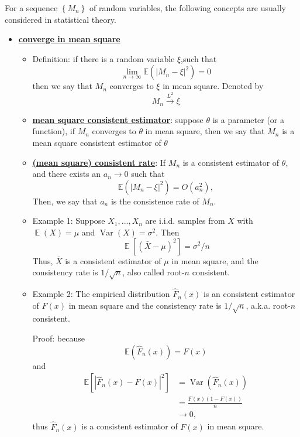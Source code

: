 \documentclass[19pt,landscaoe]{article}
\DeclareMathOperator{\E}{\mathbb{E}}
\DeclareMathOperator{\Var}{\mathrm{Var}}
\begin{document}


For a sequence $\left\{M_n\right\}$ of random variables, the following concepts are usually considered in statistical theory.

\begin{itemize}


\item \underline{\bf converge in mean square}

\begin{itemize}

\item Definition: if there is a random variable $ \xi $,such that
$$
\lim_{n\to \infty } \mathbb{E} (|M_n - \xi|^2)=0
$$
then we say that $ M_n $ converges to $ \xi $ in mean square. Denoted by
$$
M_n \stackrel{L^2}{\rightarrow} \xi
$$

\item \underline{\bf mean square consistent estimator}:  suppose $ \theta $ is a parameter (or a function), if $ M_n $ converges to $ \theta $ in mean square, then we say that $ M_n $ is a mean square consistent  estimator of $  \theta $


\item  \underline{\bf (mean square) consistent rate}: If $M_n$ is a consistent estimator of $ \theta $,  and there exists an $ a_n \to 0 $ such that 
$$
  \mathbb{E} (|M_n - \xi|^2) = O(a_n^2),
$$
Then, we say that $a_n $ is the consistence rate of $ M_n$.

\item Example 1: Suppose $ X_1, ..., X_n $ are i.i.d. samples from $ X $ with $ \E(X) = \mu $ and $ \Var(X) = \sigma^2 $. Then 
    $$
      \E [(\bar X - \mu)^2]  = \sigma^2/n  
    $$
    Thus, $ \bar X$ is a consistent estimator of $ \mu $ in mean square, and the consistency rate is $ 1/\sqrt{n} $, also called root-$n$ consistent.
\item Example 2: The empirical distribution $\hat{F}_n(x)$ is an consistent estimator of $ F(x) $ in mean square and the consistency rate is $1/\sqrt{n}$, a.k.a. root-$n$ consistent.

Proof: because
$$
    \mathbb{E}(\hat{F}_n(x)) = F(x)
$$
and 
\begin{align*}
  \mathbb{E}\left[ \left|\hat{F}_n(x) - F(x)\right|^2 \right] &= \Var(\hat{F}_n(x))\\
  & = \frac{F(x)(1-F(x))}n \\
  & \to 0,
\end{align*}
thus $\hat F_n(x)$ is a consistent estimator of $ F(x) $ in mean square.


\end{itemize}
\end{itemize}
\end{document}
